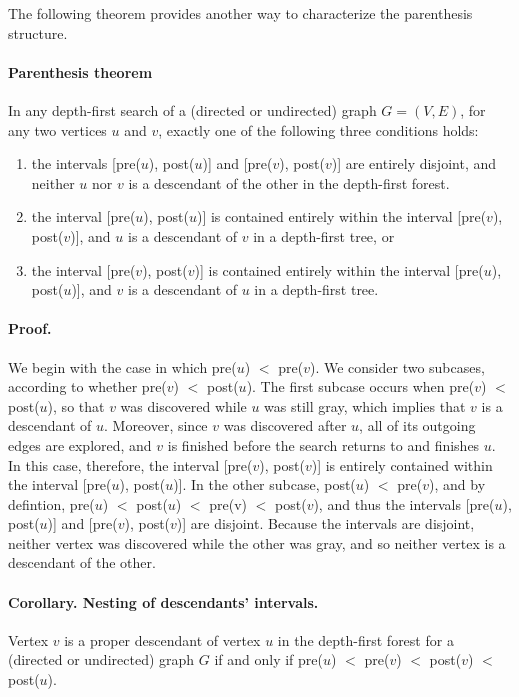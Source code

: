 The following theorem provides another way to characterize the parenthesis structure.

\paragraph{Parenthesis theorem}
In any depth-first search of a (directed or undirected) graph $G = (V, E)$, for any two vertices $u$ and $v$, exactly one of the following three conditions holds:

\begin{enumerate}
  \item the intervals [pre($u$), post($u$)] and [pre($v$), post($v$)] are entirely disjoint, and neither $u$ nor $v$ is a descendant of the other in the depth-first forest.
  \item the interval [pre($u$), post($u$)] is contained entirely within the interval [pre($v$), post($v$)], and $u$ is a descendant of $v$ in a depth-first tree, or
  \item the interval [pre($v$), post($v$)] is contained entirely within the interval [pre($u$), post($u$)], and $v$ is a descendant of $u$ in a depth-first tree.
  \end{enumerate}

  \paragraph{Proof.} We begin with the case in which pre($u$) $<$ pre($v$). We consider two subcases, according to whether pre($v$) $<$ post($u$). The first subcase occurs when pre($v$) $<$ post($u$), so that $v$ was discovered while $u$ was still gray, which implies that $v$ is a descendant of $u$. Moreover, since $v$ was discovered after $u$, all of its outgoing edges are explored, and $v$ is finished before the search returns to and finishes $u$. In this case, therefore, the interval [pre($v$), post($v$)] is entirely contained within the interval [pre($u$), post($u$)]. In the other subcase, post($u$) $<$ pre($v$), and by defintion, pre($u$) $<$ post($u$) $<$ pre(v) $<$ post($v$), and thus the intervals [pre($u$), post($u$)] and [pre($v$), post($v$)] are disjoint. Because the intervals are disjoint, neither vertex was discovered while the other was gray, and so neither vertex is a descendant of the other.



\paragraph{  Corollary. Nesting of descendants' intervals.}
  Vertex $v$ is a proper descendant of vertex $u$ in the depth-first forest for a (directed or undirected) graph $G$ if and only if pre($u$) $<$ pre($v$) $<$ post($v$) $<$ post($u$).

